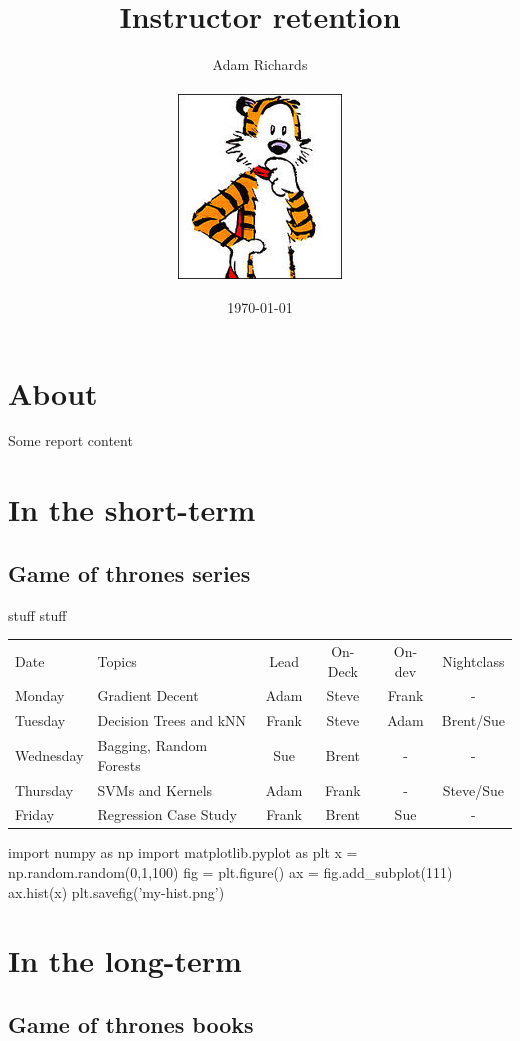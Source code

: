 \documentclass[a4paper]{article}
\title{Instructor retention}
\author{Adam Richards \\ \ \\ \includegraphics[scale=0.075]{hobbes.jpg}}
\date{\today}
\newcommand{\keywd}{\textcolor{myorange}}
\begin{document}
\maketitle 
\tableofcontents
\newpage 

\section{About}

Some report \keywd{content}


\section{In the short-term}
\subsection{Game of thrones series}

stuff stuff

\begin{table}[!h]
	\begin{center}
	\begin{tabular}{l|l|c|c|c|c}
	\hline
Date     & Topics                   & Lead    & On-Deck & On-dev & Nightclass\\
Monday   & Gradient Decent          & Adam    & Steve   & Frank  & -         \\
Tuesday  & Decision Trees and kNN   & Frank   & Steve   & Adam   & Brent/Sue \\
Wednesday& Bagging, Random Forests  & Sue     & Brent   & -      & -         \\
Thursday & SVMs and Kernels         & Adam    & Frank   & -      & Steve/Sue \\
Friday   & Regression Case Study    & Frank   & Brent   & Sue    & -         \\ 
        \hline
\end{tabular}
\end{center}
\end{table}


\begin{code}

  import numpy as np
  import matplotlib.pyplot as plt
  x = np.random.random(0,1,100)
  fig = plt.figure()
  ax = fig.add_subplot(111)
  ax.hist(x)
  plt.savefig('my-hist.png')

\end{code}




\section{In the long-term}
\subsection{Game of thrones books}
\end{document}
